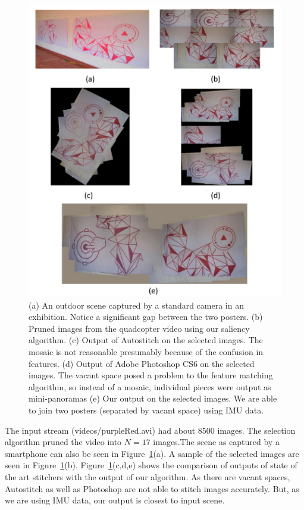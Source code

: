 \documentclass[10pt,twocolumn,letterpaper]{article}
\begin{document}
\begin{figure}[h!]
\centering
\includegraphics[width=0.85\linewidth]{figures/Purple_red.pdf}
\caption{(a) An outdoor scene captured by a standard camera in an
  exhibition. Notice a   significant gap between the two posters.  (b) Pruned
  images from the quadcopter video using our saliency algorithm. (c) Output of
  Autostitch on the selected images. The mosaic is not reasonable
  presumably because of the confusion in features. (d) Output of Adobe
  Photoshop CS6 on the selected images. The vacant space posed a
  problem to the feature matching algorithm, so instead of a mosaic,
  individual pieces were output as mini-panoramas (e) Our output on
  the selected images. We are able to join two posters (separated by
  vacant space) using IMU data.}
\label{fig:results2}
\end{figure}
	
The input stream (videos/purpleRed.avi) had about 8500 images. The selection
algorithm pruned the video into $N=17$ images.The scene as captured by a smartphone can also be seen in
Figure~\ref{fig:results2}(a). A sample of the
selected images are seen in Figure~\ref{fig:results2}(b).
Figure~\ref{fig:results2}(c,d,e) shows the comparison of outputs of state
of the art stitchers with the output of our algorithm. As there are vacant
spaces, Autostitch as well as Photoshop are not able to stitch images
accurately. But, as we are using IMU data, our output is closest to input scene.
	
\end{document}
